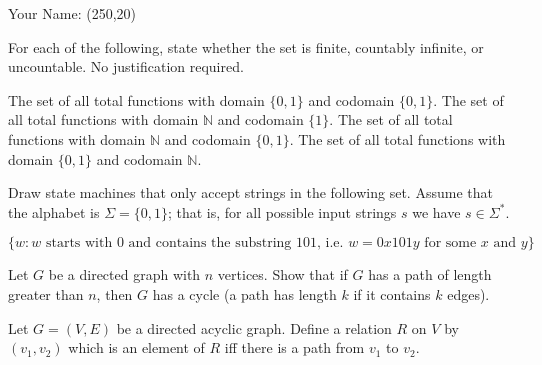 \documentclass[solution, letterpaper]{cs20exam}
\newcommand{\namebox}{\framebox(250,20){}}
\begin{document}

\vspace{-1.8in}\hbox{}\hspace{2in}Your Name: \namebox
\vspace{1.2in}


\problem{}{}

For each of the following, state whether the set is finite, countably infinite, or uncountable. No justification required.

\subproblem The set of all total functions with domain $\{0, 1\}$ and codomain $\{0, 1\}$.
\subproblem The set of all total functions with domain $\mathbb{N}$ and codomain $\{1\}$.
\subproblem The set of all total functions with domain $\mathbb{N}$ and codomain $\{0, 1\}$.
\subproblem The set of all total functions with domain $\{0, 1\}$ and codomain $\mathbb{N}$.

\begin{solution}
\end{solution}



\problem{}{}

Draw state machines that only accept strings in the following set. Assume that the alphabet is $\Sigma = \{0, 1\}$; that is, for all possible input strings $s$ we have $s \in \Sigma^*$.

$$\{w : w \text{ starts with } 0 \text{ and contains the substring } 101 \text{, i.e. } w = 0x101y \text{ for some } x \text{ and } y \}$$

\begin{solution}
\end{solution}



\problem{}{}

Let $G$ be a directed graph with $n$ vertices. Show that if $G$ has a path of length greater than $n$, then $G$ has a cycle (a path has length $k$ if it contains $k$ edges).

\begin{solution}
\end{solution}

\problem{}{}
Let $G = (V, E)$ be a directed acyclic graph. Define a relation $R$ on $V$ by $(v_1, v_2)$ which is an element of $R$ iff there is a path from $v_1$ to $v_2$.
\end{document}
